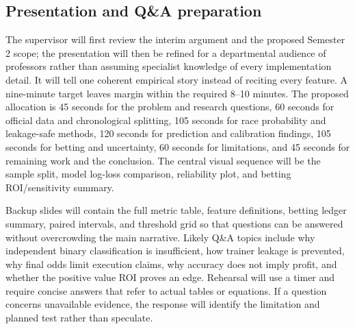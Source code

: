 \subsection{Presentation and Q\&A preparation}\label{sec:plan-presentation}
The supervisor will first review the interim argument and the proposed Semester 2 scope; the presentation will then be refined for a departmental audience of professors rather than assuming specialist knowledge of every implementation detail. It will tell one coherent empirical story instead of reciting every feature. A nine-minute target leaves margin within the required 8--10 minutes. The proposed allocation is 45 seconds for the problem and research questions, 60 seconds for official data and chronological splitting, 105 seconds for race probability and leakage-safe methods, 120 seconds for prediction and calibration findings, 105 seconds for betting and uncertainty, 60 seconds for limitations, and 45 seconds for remaining work and the conclusion. The central visual sequence will be the sample split, model log-loss comparison, reliability plot, and betting ROI/sensitivity summary.

Backup slides will contain the full metric table, feature definitions, betting ledger summary, paired intervals, and threshold grid so that questions can be answered without overcrowding the main narrative. Likely Q\&A topics include why independent binary classification is insufficient, how trainer leakage is prevented, why final odds limit execution claims, why accuracy does not imply profit, and whether the positive value ROI proves an edge. Rehearsal will use a timer and require concise answers that refer to actual tables or equations. If a question concerns unavailable evidence, the response will identify the limitation and planned test rather than speculate.
